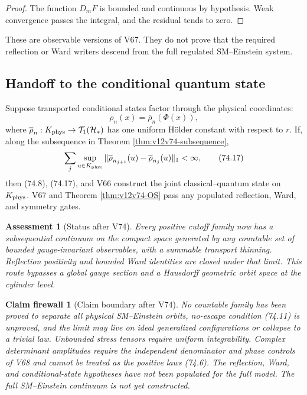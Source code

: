 \documentclass[11pt]{article}
\newtheorem{firewall}[theorem]{Claim firewall}
\newtheorem{assessment}[theorem]{Assessment}
\theoremstyle{remark}
\begin{document}
\begin{proof}
The function \(D_mF\) is bounded and continuous by hypothesis.
Weak convergence passes the integral, and the residual tends to
zero.
\end{proof}

These are observable versions of V67.  They do not prove that the
required reflection or Ward writers descend from the full regulated
SM--Einstein system.

\subsection{Handoff to the conditional quantum state}

Suppose transported conditional states factor through the physical
coordinates:
\[
                    \rho_n(x)=\overline\rho_n(\Phi(x)),       \tag{74.16}
\]
where
\(\overline\rho_n:K_{\rm phys}\to{\cal T}_1({\cal H}_*)\)
has one uniform Hölder constant with respect to \(r\).  If, along the
subsequence in Theorem \ref{thm:v12v74-subsequence},
\begin{equation}
 \sum_j\sup_{u\in K_{\rm phys}}
 \|\overline\rho_{n_{j+1}}(u)
   -\overline\rho_{n_j}(u)\|_1<\infty,                       \tag{74.17}
\end{equation}
then (74.8), (74.17), and V66 construct the joint
classical--quantum state on \(K_{\rm phys}\).  V67 and Theorem
\ref{thm:v12v74-OS} pass any populated reflection, Ward, and symmetry
gates.

\begin{assessment}[Status after V74]
\label{ass:v12v74-status}
Every positive cutoff family now has a subsequential continuum on
the compact space generated by any countable set of bounded
gauge-invariant observables, with a summable transport thinning.
Reflection positivity and bounded Ward identities are closed under
that limit.  This route bypasses a global gauge section and a
Hausdorff geometric orbit space at the cylinder level.
\end{assessment}

\begin{firewall}[Claim boundary after V74]
\label{fire:v12v74-claim}
No countable family has been proved to separate all physical
SM--Einstein orbits, no-escape condition (74.11) is unproved, and the
limit may live on ideal generalized configurations or collapse to a
trivial law.  Unbounded stress tensors require uniform
integrability.  Complex determinant amplitudes require the
independent denominator and phase controls of V68 and cannot be
treated as the positive laws (74.6).  The reflection, Ward, and
conditional-state hypotheses have not been populated for the full
model.  The full SM--Einstein continuum is not yet constructed.
\end{firewall}
\end{document}
